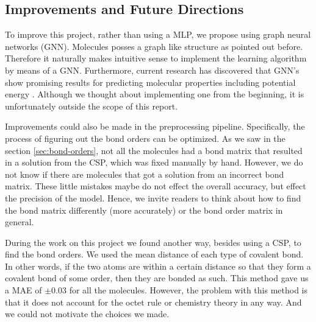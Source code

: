 \subsection{Improvements and Future Directions}

To improve this project, rather than using a MLP, we propose using graph neural networks (GNN). Molecules posses a graph like structure as pointed out before. Therefore it naturally makes intuitive sense to implement the learning algorithm by means of a GNN. Furthermore, current research has discovered that GNN's show promising results for predicting molecular properties including potential energy \cite{gnn1, gnn2}. Although we thought about implementing one from the beginning, it is unfortunately outside the scope of this report. 

Improvements could also be made in the preprocessing pipeline. Specifically, the process of figuring out the bond orders can be optimized. As we saw in the section \ref{sec:bond-orders}, not all the molecules had a bond matrix that resulted in a solution from the CSP, which was fixed manually by hand. However, we do not know if  there are molecules that got a solution from an incorrect bond matrix. These little mistakes maybe do not effect the overall accuracy, but effect the precision of the model. Hence, we invite readers to think about how to find the bond matrix differently (more accurately) or the bond order matrix in general.

During the work on this project we found another way, besides using a CSP, to find the bond orders. We used the mean distance of each type of covalent bond. In other words, if the two atoms are within a certain distance so that they form a covalent bond of some order, then they are bonded as such. This method gave us a MAE of $\pm0.03$ for all the molecules. However, the problem with this method is that it does not account for the octet rule or chemistry theory in any way. And we could not motivate the choices we made.